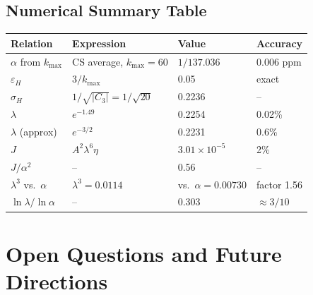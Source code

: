 \documentclass[11pt]{article}
\theoremstyle{remark}
\begin{document}
\subsection{Numerical Summary Table}

\begin{center}
\begin{tabular}{llll}
\toprule
\textbf{Relation} & \textbf{Expression} & \textbf{Value} & \textbf{Accuracy} \\
\midrule
$\alpha$ from $k_{\max}$ & CS average, $k_{\max}=60$ & $1/137.036$ & 0.006 ppm \\
$\varepsilon_H$ & $3/k_{\max}$ & 0.05 & exact \\
$\sigma_H$ & $1/\sqrt{|C_3|} = 1/\sqrt{20}$ & 0.2236 & -- \\
$\lambda$ & $e^{-1.49}$ & 0.2254 & 0.02\% \\
$\lambda$ (approx) & $e^{-3/2}$ & 0.2231 & 0.6\% \\
$J$ & $A^2\lambda^6\eta$ & $3.01 \times 10^{-5}$ & 2\% \\
$J/\alpha^2$ & -- & 0.56 & -- \\
$\lambda^3$ vs.\ $\alpha$ & $\lambda^3 = 0.0114$ & vs.\ $\alpha = 0.00730$ & factor 1.56 \\
$\ln\lambda/\ln\alpha$ & -- & 0.303 & $\approx 3/10$ \\
\bottomrule
\end{tabular}
\end{center}

\section{Open Questions and Future Directions}
\label{sec:open}
\end{document}
